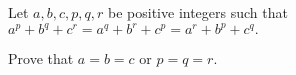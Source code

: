 Let $a,b,c,p,q,r$ be positive integers such that $a^p+b^q+c^r=a^q+b^r+c^p=a^r+b^p+c^q.$

Prove that $a=b=c$ or $p=q=r$.

